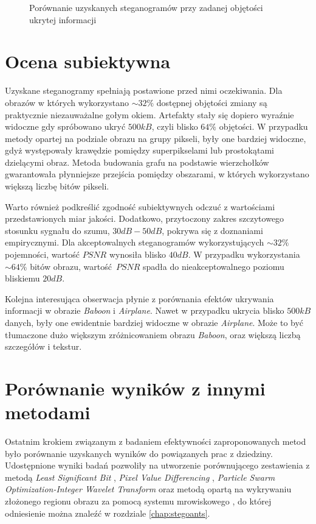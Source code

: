 {{{\begin{figure}
                \caption[Porównanie rezultatów]
                {Porównanie uzyskanych steganogramów przy zadanej objętości ukrytej informacji}
                \label{fig:exp-edge-results}
            \end{figure}
        }
    }

    \section{Ocena subiektywna}
    {
        Uzyskane steganogramy spełniają postawione przed nimi oczekiwania. Dla obrazów w których wykorzystano $\sim
        32\%$ dostępnej objętości zmiany są praktycznie niezauważalne gołym okiem. Artefakty stały się dopiero wyraźnie
        widoczne gdy spróbowano ukryć $500kB$, czyli blisko $64\%$ objętości. W przypadku metody opartej na podziale
        obrazu na grupy pikseli, były one bardziej widoczne, gdyż występowały krawędzie pomiędzy superpikselami lub
        prostokątami dzielącymi obraz. Metoda budowania grafu na podstawie wierzchołków gwarantowała płynniejsze
        przejścia pomiędzy obszarami, w których wykorzystano większą liczbę bitów pikseli.

        Warto również podkreślić zgodność subiektywnych odczuć z wartościami przedstawionych miar jakości. Dodatkowo,
        przytoczony zakres szczytowego stosunku sygnału do szumu, $30dB - 50dB$, pokrywa się z doznaniami empirycznymi.
        Dla akceptowalnych steganogramów wykorzystujących $\sim 32\%$ pojemności, wartość $PSNR$ wynosiła blisko $40dB$.
        W przypadku wykorzystania $\sim 64\%$ bitów obrazu, wartość $PSNR$ spadła do nieakceptowalnego poziomu bliskiemu
        $20dB$.

        Kolejna interesująca obserwacja płynie z porównania efektów ukrywania informacji w obrazie \textit{Baboon} i
        \textit{Airplane}. Nawet w przypadku ukrycia blisko $500kB$ danych, były one ewidentnie bardziej widoczne w
        obrazie \textit{Airplane}. Może to być tłumaczone dużo większym zróżnicowaniem obrazu \textit{Baboon}, oraz
        większą liczbą szczegółów i tekstur.
    }

    \section{Porównanie wyników z innymi metodami}
    {
        Ostatnim krokiem związanym z badaniem efektywności zaproponowanych metod było porównanie uzyskanych wyników do
        powiązanych prac z dziedziny. Udostępnione wyniki badań pozwoliły na utworzenie porównującego zestawienia z
        metodą \textit{Least Significant Bit} \cite{Solak2018LSBSA}, \textit{Pixel Value
        Differencing} \cite{Solak2018LSBSA}, \textit{Particle Swarm Optimization-Integer Wavelet
        Transform} \cite{Muhuri2020ANI} oraz metodą opartą na wykrywaniu złożonego regionu obrazu za pomocą systemu
        mrowiskowego \cite{Khan2018AntCO}, do której odniesienie można znaleźć w rozdziale \ref{chap:stegoants}.

}}
